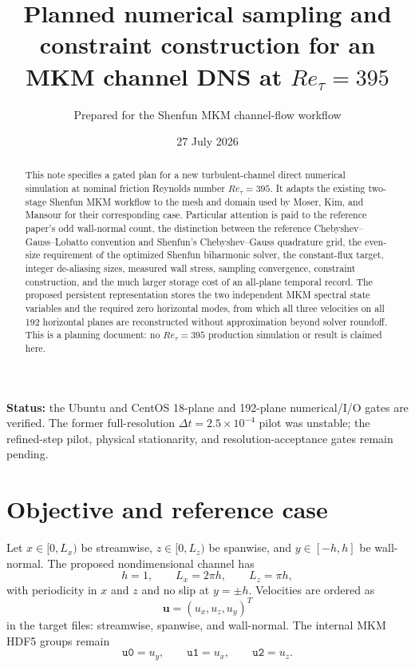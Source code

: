 \documentclass[11pt]{article}
\title{Planned numerical sampling and constraint construction for an MKM channel DNS at $Re_{\tau}=395$}
\author{Prepared for the Shenfun MKM channel-flow workflow}
\date{27 July 2026}
\newcommand{\bfu}{\bm{u}}
\begin{document}
\maketitle

\begin{abstract}
This note specifies a gated plan for a new turbulent-channel direct numerical
simulation at nominal friction Reynolds number $Re_{\tau}=395$.  It adapts the
existing two-stage Shenfun MKM workflow to the mesh and domain used by Moser,
Kim, and Mansour for their corresponding case.  Particular attention is paid
to the reference paper's odd wall-normal count, the distinction between the reference
Chebyshev--Gauss--Lobatto convention and Shenfun's Chebyshev--Gauss quadrature
grid, the even-size requirement of the optimized Shenfun biharmonic solver,
the constant-flux target, integer de-aliasing sizes, measured wall stress,
sampling convergence, constraint construction, and the much larger storage
cost of an all-plane temporal record.  The proposed persistent representation
stores the two independent MKM spectral state variables and the required zero
horizontal modes, from which all three velocities on all 192 horizontal
planes are reconstructed without approximation beyond solver roundoff.  This
is a planning document: no $Re_{\tau}=395$ production simulation or result is
claimed here.
\end{abstract}

\noindent\textbf{Status:} the Ubuntu and CentOS 18-plane and 192-plane
numerical/I/O gates are verified.  The former full-resolution
$\Delta t=2.5\times10^{-4}$ pilot was unstable; the refined-step pilot,
physical stationarity, and resolution-acceptance gates remain pending.

\section{Objective and reference case}

Let $x\in[0,L_x)$ be streamwise, $z\in[0,L_z)$ be spanwise, and
$y\in[-h,h]$ be wall-normal.  The proposed nondimensional channel has
\begin{equation}
  h=1,\qquad L_x=2\pi h,\qquad L_z=\pi h,
  \label{eq:domain}
\end{equation}
with periodicity in $x$ and $z$ and no slip at $y=\pm h$.  Velocities are
ordered as
\[
  \bfu=(u_x,u_z,u_y)^T
\]
in the target files: streamwise, spanwise, and wall-normal.  The internal MKM
HDF5 groups remain
\[
  \texttt{u0}=u_y,\qquad \texttt{u1}=u_x,\qquad
  \texttt{u2}=u_z.
\]
\end{document}
